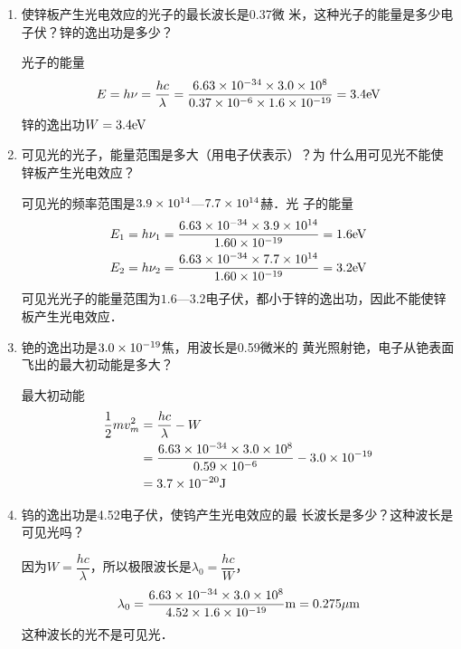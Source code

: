\begin{enumerate}
    \item 使锌板产生光电效应的光子的最长波长是0.37微
米，这种光子的能量是多少电子伏？锌的逸出功是多少？

\begin{solution}
光子的能量
\[E=h\nu=\frac{hc}{\lambda}=\frac{6.63\times 10^{-34}\times 3.0\times 10^8}{0.37\times 10^{-6}\times 1.6\times 10^{-19}}=3.4{\rm eV}\]
锌的逸出功$W=3.4{\rm eV}$
\end{solution}
\item 可见光的光子，能量范围是多大（用电子伏表示）？为
什么用可见光不能使锌板产生光电效应？

\begin{solution}
可见光的频率范围是$3.9\times10^{14}$—$7.7\times10^{14}$赫．光
子的能量
\[\begin{split}
E_1&=h\nu_1=\frac{6.63\times 10^{-34}\times 3.9\times10^{14}}{1.60\times10^{-19}}=1.6{\rm eV}\\
E_2&=h\nu_2=\frac{6.63\times 10^{-34}\times 7.7\times10^{14}}{1.60\times10^{-19}}=3.2{\rm eV}\\
\end{split}\]
可见光光子的能量范围为$1.6$—$3.2$电子伏，都小于锌的逸出功，因此不能使锌板产生光电效应．
\end{solution}
\item 铯的逸出功是$3.0\times10^{-19}$焦，用波长是0.59微米的
黄光照射铯，电子从铯表面飞出的最大初动能是多大？

\begin{solution}
最大初动能
\[\begin{split}
    \frac{1}{2}mv^2_m &=\frac{hc}{\lambda}-W\\
    &=\frac{6.63\times 10^{-34}\times 3.0\times 10^8}{0.59\times 10^{-6}}-3.0\times 10^{-19}\\
    &=3.7\times 10^{-20}{\rm J}
\end{split}\]
\end{solution}
\item 钨的逸出功是4.52电子伏，使钨产生光电效应的最
长波长是多少？这种波长是可见光吗？

\begin{solution}
因为$W=\dfrac{hc}{\lambda}$，所以极限波长是$\lambda_0=\dfrac{hc}{W}$，
\[\lambda_0=\frac{6.63\times 10^{-34}\times 3.0\times 10^8}{4.52\times 1.6\times 10^{-19}}{\rm m}=0.275\mu{\rm m}\]
这种波长的光不是可见光．
\end{solution}
\end{enumerate}




